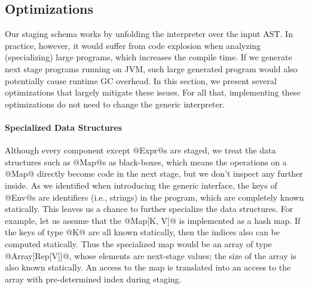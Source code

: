 \subsection{Optimizations} \label{staged_ds}

\iffalse
Revision: Solving Practical Challenges.
theoretically, all the things should work nicely. Unfolding the interpreter over the AST.
But the generated code is blowed up. For example .... This should not affect the correctness,
but poses burden on the MSP system (ie LMS) and the next stage compiler/runtime (ie, scalac and JVM).
1) LMS becomes slower since a large IR graph is contructed during the staging.
2) Scalac becomes slower when reading a such large source code.
JVM has certain limitation on the size of a single method.

TODO: can we formulate selective caching as a partially-static data law.
TODO: lambda lifting for if
\fi

Our staging schema works by unfolding the interpreter over the input AST. In
practice, however, it would suffer from code explosion when analyzing
(specializing) large programs, which increases the compile time. If we generate
next stage programs running on JVM, such large generated program would also
potentially cause runtime GC overhead. In this section, we present several
optimizations that largely mitigate these issues. For all that, implementing
these optimizations do not need to change the generic interpreter.

\paragraph{Specialized Data Structures}

Although every component except @Expr@s are staged, we treat the data
structures such as @Map@s as black-boxes, which means the operations on a @Map@
directly become code in the next stage, but we don't inspect any further inside.
As we identified when introducing the generic interface, the keys of @Env@s are
identifiers (i.e., strings) in the program, which are completely known
statically. This leaves us a chance to further specialize the data structures.
For example, let us assume that the @Map[K, V]@ is implemented as a hash map. If
the keys of type @K@ are all known statically, then the indices also can be
computed statically. Thus the specialized map would be an array of type
@Array[Rep[V]]@, whose elements are next-stage values; the size of the array is
also known statically. An access to the map is translated into an access to the
array with pre-determined index during staging.

